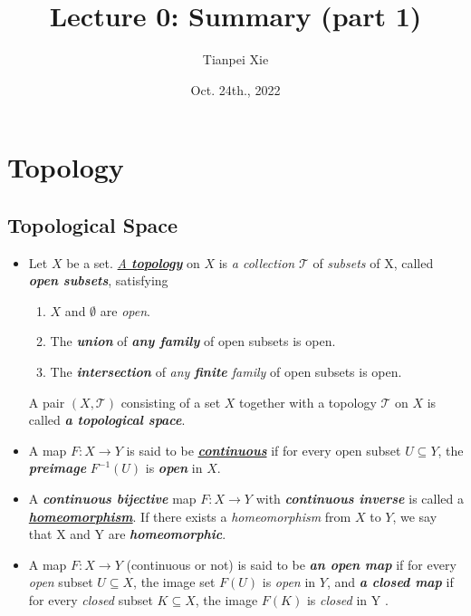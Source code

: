 \documentclass[11pt]{article}
\begin{document}
\title{Lecture 0: Summary (part 1)}
\author{ Tianpei Xie}
\date{Oct. 24th., 2022}
\maketitle
\tableofcontents
\newpage
\section{Topology}
\subsection{Topological Space}
\begin{itemize}
\item 
\begin{definition} 
Let $X$ be a set. \underline{\emph{A \textbf{topology}}} on $X$ is \emph{a collection} $\mathscr{T}$ of \emph{subsets} of X, called \emph{\textbf{open subsets}}, satisfying
\begin{enumerate}
\item $X$ and $\emptyset$ are \emph{open}.
\item The \emph{\textbf{union}} of \emph{\textbf{any family}} of open subsets is open.
\item The \emph{\textbf{intersection}} of \emph{any \textbf{finite} family} of open subsets is open.
\end{enumerate}
A pair $(X, \mathscr{T})$ consisting of a set $X$ together with a topology $\mathscr{T}$ on $X$ is called \emph{\textbf{a topological space}}.
\end{definition}

\item \begin{definition}
A map $F: X \rightarrow Y$ is said to be \underline{\emph{\textbf{continuous}}} if for every open subset $U \subseteq Y$, the \emph{\textbf{preimage}} $F^{-1}(U)$ is \emph{\textbf{open}} in $X$.
\end{definition}

\item \begin{definition}
A \emph{\textbf{continuous bijective}} map $F: X \rightarrow Y$ with \emph{\textbf{continuous inverse}} is called a \underline{\emph{\textbf{homeomorphism}}}. If there exists a \emph{homeomorphism} from $X$ to $Y$, we say that X and Y are \emph{\textbf{homeomorphic}}.
\end{definition}

\item \begin{definition}
A map $F: X \rightarrow Y$ (continuous or not) is said to be \emph{\textbf{an open map}} if for every \emph{open} subset $U \subseteq X$, the image set $F(U)$ is \emph{open} in $Y$, and  \emph{\textbf{a closed map}} if for every \emph{closed} subset $K \subseteq X$, the image $F(K)$ is \emph{closed} in Y . 
\end{definition}




\end{itemize}
\end{document}
